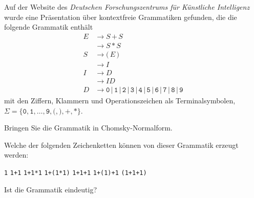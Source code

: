 Auf der Website des {\em Deutschen Forschungszentrums für Künstliche
Intelligenz} wurde eine Präsentation über kontextfreie 
Grammatiken gefunden, die die folgende Grammatik enthält
\begin{align*}
E&\to S\,\texttt{+}\,S\\
 &\to S\,\texttt{*}\,S\\
S&\to \texttt{(}\, E \, \texttt{)} \\
 &\to I\\
I&\to D\\ 
 &\to I D\\
D&\to
\texttt{0}
\,|\,
\texttt{1}
\,|\,
\texttt{2}
\,|\,
\texttt{3}
\,|\,
\texttt{4}
\,|\,
\texttt{5}
\,|\,
\texttt{6}
\,|\,
\texttt{7}
\,|\,
\texttt{8}
\,|\,
\texttt{9}
\end{align*}
mit den Ziffern, Klammern und Operationszeichen als Terminalsymbolen,
$\Sigma = \{\texttt{0},\texttt{1},\dots,\texttt{9},\texttt{(},\texttt{)},\texttt{+},\texttt{*}\}$.
\begin{teilaufgaben}
\item
Bringen Sie die Grammatik in Chomsky-Normalform.
\item
Welche der folgenden Zeichenketten können von dieser Grammatik
erzeugt werden:
\begin{center}
\texttt{1}
\qquad
\texttt{1+1}
\qquad
\texttt{1+1*1}
\qquad
\texttt{1+(1*1)}
\qquad
\texttt{1+1+1}
\qquad
\texttt{1+(1)+1}
\qquad
\texttt{(1+1+1)}
\end{center}
\item 
Ist die Grammatik eindeutig?
\end{teilaufgaben}


